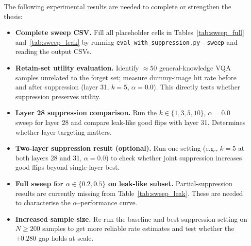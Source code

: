 \documentclass[12pt, a4paper]{article}
\begin{document}
The following experimental results are needed to complete or strengthen the thesis:

\begin{itemize}[leftmargin=*, itemsep=4pt]
  \item \textbf{Complete sweep CSV.}
    Fill all placeholder cells in Tables~\ref{tab:sweep_full} and~\ref{tab:sweep_leak}
    by running \texttt{eval\_with\_suppression.py --sweep} and reading the output CSVs.

  \item \textbf{Retain-set utility evaluation.}
    Identify $\approx 50$ general-knowledge VQA samples unrelated to the forget set;
    measure dummy-image hit rate before and after suppression (layer 31, $k=5$,
    $\alpha=0.0$). This directly tests whether suppression preserves utility.

  \item \textbf{Layer 28 suppression comparison.}
    Run the $k \in \{1,3,5,10\}$, $\alpha=0.0$ sweep for layer 28 and compare
    leak-like good flips with layer 31. Determines whether layer targeting matters.

  \item \textbf{Two-layer suppression result (optional).}
    Run one setting (e.g., $k=5$ at both layers 28 and 31, $\alpha=0.0$) to check
    whether joint suppression increases good flips beyond single-layer best.

  \item \textbf{Full sweep for $\alpha \in \{0.2, 0.5\}$ on leak-like subset.}
    Partial-suppression results are currently missing from Table~\ref{tab:sweep_leak}.
    These are needed to characterise the $\alpha$--performance curve.

  \item \textbf{Increased sample size.}
    Re-run the baseline and best suppression setting on $N \geq 200$ samples to
    get more reliable rate estimates and test whether the $+0.280$ gap holds at scale.
\end{itemize}



\newpage

\end{document}
